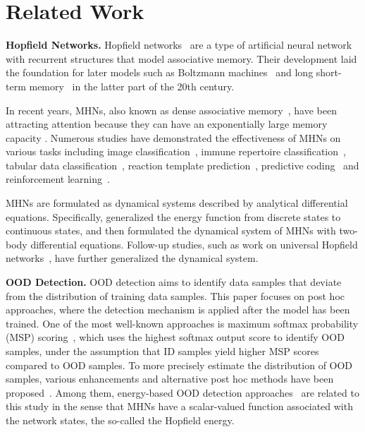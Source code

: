 \section{Related Work}
\noindent
\textbf{Hopfield Networks.}
Hopfield networks~\cite{hopfield82, hopfield88} are a type of artificial neural network with recurrent structures that model associative memory.
Their development laid the foundation for later models such as Boltzmann machines~\cite{Ackley1985boltzmannmachines} and long short-term memory~\cite{lstm} in the latter part of the 20th century.

In recent years, MHNs, also known as dense associative memory~\cite{krotov16dense}, have been attracting attention because they can have an exponentially large memory capacity \cite{demircigil17hugecapacity}.
Numerous studies have demonstrated the effectiveness of MHNs on various tasks including image classification~\cite{furst2021cloob, ota2023learning}, immune repertoire classification~\cite{widrich20modern},
tabular data classification~\cite{schafl2021hopular},
reaction template prediction~\cite{seidl2022improving},
predictive coding~\cite{NEURIPS2021_1fb36c4c} and reinforcement learning~\cite{widrich2021modern}.

MHNs are formulated as dynamical systems described by analytical differential equations.
Specifically, \citet{ramsauer21hopfieldallyouneed} generalized the energy function from discrete states to continuous states, and then \citet{krotov2021large} formulated the dynamical system of MHNs with two-body differential equations.
Follow-up studies, such as work on universal Hopfield networks~\cite{millidge2022universal}, have further generalized the dynamical system.

\noindent \textbf{OOD Detection.}
OOD detection aims to identify data samples that deviate from the distribution of training data samples.
This paper focuses on post hoc approaches, where the detection mechanism is applied after the model has been trained.
One of the most well-known approaches is maximum softmax probability (MSP) scoring~\cite{hendrycks2017msp}, which uses the highest softmax output score to identify OOD samples, under the assumption that ID samples yield higher MSP scores compared to OOD samples.
To more precisely estimate the distribution of OOD samples, various enhancements and alternative post hoc methods have been proposed~\cite{liang2018odin,liu2020energy,sun2021react,sun2022dice,shen2023posthoc,chen2024tagfog}.
Among them, energy-based OOD detection approaches~\cite{liu2020energy, sun2021react} are related to this study in the sense that MHNs have a scalar-valued function associated with the network states, the so-called the Hopfield energy.

